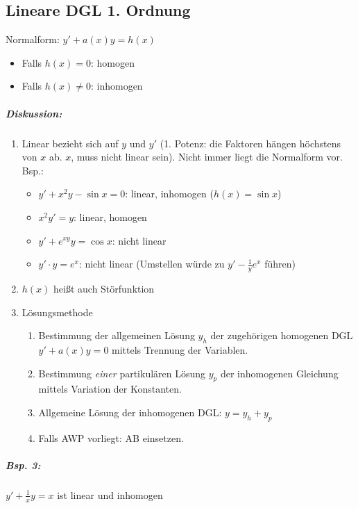\subsection{Lineare DGL 1. Ordnung}
Normalform: $y'+a(x)y=h(x)$
\begin{itemize}
\item Falls $h(x)=0$: homogen
\item Falls $h(x) \not = 0$: inhomogen
\end{itemize}
\subparagraph{Diskussion:}
\begin{enumerate}
\item Linear bezieht sich auf $y$ und $y'$ (1. Potenz: die Faktoren hängen höchstens von $x$ ab. $x$, muss nicht linear sein). Nicht immer liegt die Normalform vor.\\
Bsp.:
\begin{itemize}
\item $y'+x^2y-\sin x = 0$: linear, inhomogen ($h(x)=\sin x$)
\item $x^2y' = y$: linear, homogen
\item $y'+e^{xy}y=\cos x$: nicht linear
\item $y'\cdot y = e^x$: nicht linear (Umstellen würde zu $y'-\tfrac{1}{y}e^x$ führen)
\end{itemize}
\item $h(x)$ heißt auch Störfunktion
\item Lösungsmethode
\begin{enumerate}
\item Bestimmung der allgemeinen Lösung $y_h $ der zugehörigen homogenen DGL $y'+a(x)y=0$ mittels Trennung der Variablen.
\item Bestimmung \emph{einer} partikulären Lösung $y_p$ der inhomogenen Gleichung mittels Variation der Konstanten.
\item Allgemeine Lösung der inhomogenen DGL: $y=y_h+y_p$
\item Falls AWP vorliegt: AB einsetzen.
\end{enumerate}
\end{enumerate}
\subparagraph{Bsp. 3:} $y'+\frac{1}{x}y=x$ ist linear und inhomogen
